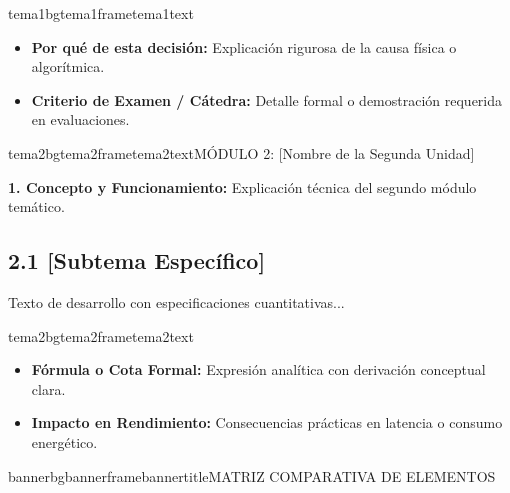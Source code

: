 \documentclass[9pt,a4paper]{extarticle}
\begin{document}
\begin{conceptbox}{tema1bg}{tema1frame}{tema1text}
\begin{itemize}[leftmargin=10pt, itemsep=0.5pt, topsep=1pt]
    \item \textbf{Por qué de esta decisión:} Explicación rigurosa de la causa física o algorítmica.
    \item \textbf{Criterio de Examen / Cátedra:} Detalle formal o demostración requerida en evaluaciones.
\end{itemize}
\end{conceptbox}

\begin{bloqueheader}{tema2bg}{tema2frame}{tema2text}{MÓDULO 2: [Nombre de la Segunda Unidad]}
\end{bloqueheader}

\textbf{1. Concepto y Funcionamiento:}
Explicación técnica del segundo módulo temático.

\subsection{2.1 [Subtema Específico]}
Texto de desarrollo con especificaciones cuantitativas...

\begin{conceptbox}{tema2bg}{tema2frame}{tema2text}
\begin{itemize}[leftmargin=10pt, itemsep=0.5pt, topsep=1pt]
    \item \textbf{Fórmula o Cota Formal:} Expresión analítica con derivación conceptual clara.
    \item \textbf{Impacto en Rendimiento:} Consecuencias prácticas en latencia o consumo energético.
\end{itemize}
\end{conceptbox}

\vspace{3pt}
\begin{bloqueheader}{bannerbg}{bannerframe}{bannertitle}{MATRIZ COMPARATIVA DE ELEMENTOS}
\end{bloqueheader}
\end{document}
